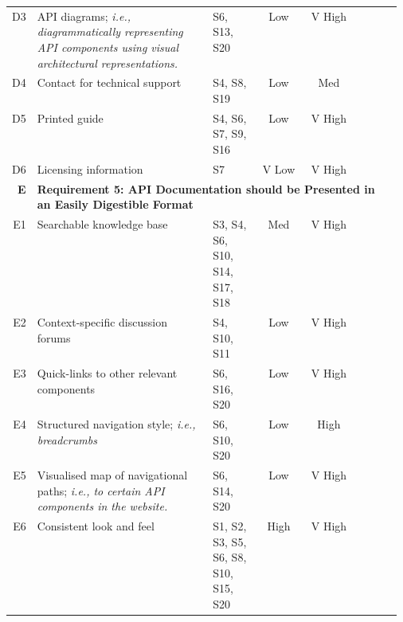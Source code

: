 \begin{landscape}
{\begin{longtable}{rp{0.45\linewidth}|p{0.125\linewidth}|cc|ccc}
  D3&
  API diagrams; \textit{i.e., diagrammatically representing API components using visual architectural representations.}
  &
  \scriptsize S6, S13, S20 &
  \cellcolor[HTML]{f6b26b}Low&\cellcolor[HTML]{57bb8a}V High&\circlenotpresent{}&\circlenotpresent{}&\circlenotpresent{}\\

  D4&
  Contact for technical support
  &
  \scriptsize S4, S8, S19 &
  \cellcolor[HTML]{f6b26b}Low&\cellcolor[HTML]{ffd666}Med&\circlepresent{}&\circlepresent{}&\circlepresent{}\\

  D5&
  Printed guide
  &
  \scriptsize S4, S6, S7, S9, S16 &
  \cellcolor[HTML]{f6b26b}Low&\cellcolor[HTML]{57bb8a}V High&\circlenotpresent{}&\circlepresent{}&\circlepresent{}\\

  D6&
  Licensing information
  &
  \scriptsize S7 &
  \cellcolor[HTML]{e67c73}V Low&\cellcolor[HTML]{57bb8a}V High&\circlenotpresent{}&\circlenotpresent{}&\circlepartialpresent{}\\

  \midrule
  \textbf{E}&
  \multicolumn{7}{l}{\textbf{Requirement 5: API Documentation should be Presented in an Easily Digestible Format}}\\
  \midrule
  
  E1&
  Searchable knowledge base
  &
  \scriptsize S3, S4, S6, S10, S14, S17, S18 &
  \cellcolor[HTML]{ffd666}Med&\cellcolor[HTML]{57bb8a}V High&\circlepresent{}&\circlepresent{}&\circlepresent{}\\

  E2&
  Context-specific discussion forums
  &
  \scriptsize S4, S10, S11 &
  \cellcolor[HTML]{f6b26b}Low&\cellcolor[HTML]{57bb8a}V High&\circlepresent{}&\circlepresent{}&\circlepartialpresent{}\\

  E3&
  Quick-links to other relevant components
  &
  \scriptsize S6, S16, S20 &
  \cellcolor[HTML]{f6b26b}Low&\cellcolor[HTML]{57bb8a}V High&\circlenotpresent{}&\circlenotpresent{}&\circlenotpresent{}\\

  E4&
  Structured navigation style; \textit{i.e., breadcrumbs}
  &
  \scriptsize S6, S10, S20 &
  \cellcolor[HTML]{f6b26b}Low&\cellcolor[HTML]{a7c47d}High&\circlepresent{}&\circlepresent{}&\circlepresent{}\\

  E5&
  Visualised map of navigational paths; \textit{i.e., to certain API components in the website.}
  &
  \scriptsize S6, S14, S20 &
  \cellcolor[HTML]{f6b26b}Low&\cellcolor[HTML]{57bb8a}V High&\circlenotpresent{}&\circlenotpresent{}&\circlenotpresent{}\\

  {E6}&
  Consistent look and feel
  &
  \scriptsize {S1, S2, S3, S5, S6, S8, S10, S15, S20} &
  \cellcolor[HTML]{a7c47d}High&\cellcolor[HTML]{57bb8a}V High&\circlepresent{}&\circlepresent{}&\circlepresent{}\\
\end{longtable}
\normalsize}
\end{landscape}

